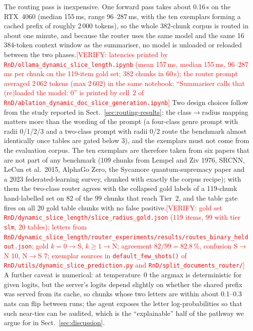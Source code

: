 \documentclass[pdflatex,sn-mathphys-num]{sn-jnl}
\newcommand{\todo}[1]{\textcolor{red}{#1}}
\newcommand{\verify}[1]{\todo{[VERIFY: #1]}}
\theoremstyle{thmstyleone}%
\theoremstyle{thmstylethree}%
\begin{document}
The routing pass is inexpensive. One forward pass takes about 0.16\,s on the RTX~4060 (median 155\,ms, range 96--287\,ms, with the ten exemplars forming a cached prefix of roughly 2\,000 tokens), so the whole 382-chunk corpus is routed in about one minute, and because the router uses the same model and the same 16\,384-token context window as the summariser, no model is unloaded or reloaded between the two phases.\verify{latencies printed by \texttt{RnD/ollama\_dynamic\_slice\_length.ipynb} (mean 157\,ms, median 155\,ms, 96--287\,ms per chunk on the 119-item gold set; 382 chunks in 60\,s); the router prompt averaged 2\,062 tokens (max 2\,602) in the same notebook; ``Summariser calls that (re)loaded the model: 0'' is printed by cell~2 of \texttt{RnD/ablation\_dynamic\_doc\_slice\_generation.ipynb}} Two design choices follow from the study reported in Sect.~\ref{sec:routing-results}: the class$\to$radius mapping matters more than the wording of the prompt (a four-class genre prompt with radii 0/1/2/3 and a two-class prompt with radii 0/2 route the benchmark almost identically once tables are gated below 3), and the exemplars must not come from the evaluation corpus. The ten exemplars are therefore taken from six papers that are not part of any benchmark (109 chunks from Lempel and Ziv 1976, SRCNN, LeCun et al.\ 2015, AlphaGo Zero, the Sycamore quantum-supremacy paper and a 2023 federated-learning survey, chunked with exactly the corpus recipe); with them the two-class router agrees with the collapsed gold labels of a 119-chunk hand-labelled set on 82 of the 99 chunks that reach Tier~2, and the table gate fires on all 20 gold table chunks with no false positive.\verify{gold set \texttt{RnD/dynamic\_slice\_length/slice\_radius\_gold.json} (119 items, 99 with tier \texttt{slm}, 20 tables); letters from \texttt{RnD/dynamic\_slice\_length/router\_experiments/results/routes\_binary\_heldout.json}; gold $k=0\to$S, $k\ge1\to$N; agreement $82/99=82.8\,\%$, confusion S$\to$N 10, N$\to$S 7; exemplar sources in \texttt{default\_few\_shots()} of \texttt{RnD/utils/dynamic\_slice\_prediction.py} and \texttt{RnD/split\_documents\_router/}} A further caveat is numerical: at temperature~0 the argmax is deterministic for given logits, but the server's logits depend slightly on whether the shared prefix was served from its cache, so chunks whose two letters are within about 0.1--0.3 nats can flip between runs; the agent exposes the letter log-probabilities so that such near-ties can be audited, which is the ``explainable'' half of the pathway we argue for in Sect.~\ref{sec:discussion}.
\end{document}
